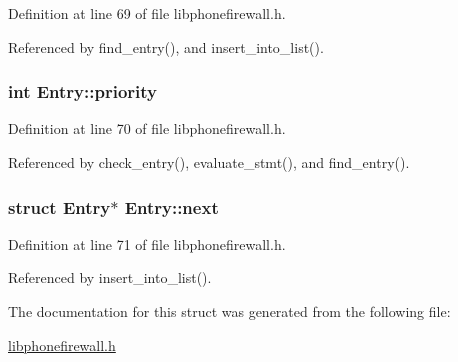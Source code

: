 Definition at line 69 of file libphonefirewall.h.

Referenced by find\_\-entry(), and insert\_\-into\_\-list().\hypertarget{structEntry_85af261b3171c257892b54a7200da061}{
\subsubsection{\setlength{\rightskip}{0pt plus 5cm}int {\bf Entry::priority}}}
\label{structEntry_85af261b3171c257892b54a7200da061}




Definition at line 70 of file libphonefirewall.h.

Referenced by check\_\-entry(), evaluate\_\-stmt(), and find\_\-entry().\hypertarget{structEntry_08cba741f383cd7da0f3ab9aee6e3cd5}{
\subsubsection{\setlength{\rightskip}{0pt plus 5cm}struct {\bf Entry}$\ast$ {\bf Entry::next}}}
\label{structEntry_08cba741f383cd7da0f3ab9aee6e3cd5}




Definition at line 71 of file libphonefirewall.h.

Referenced by insert\_\-into\_\-list().

The documentation for this struct was generated from the following file:\begin{CompactItemize}
\item 
\hyperlink{libphonefirewall_8h}{libphonefirewall.h}\end{CompactItemize}
